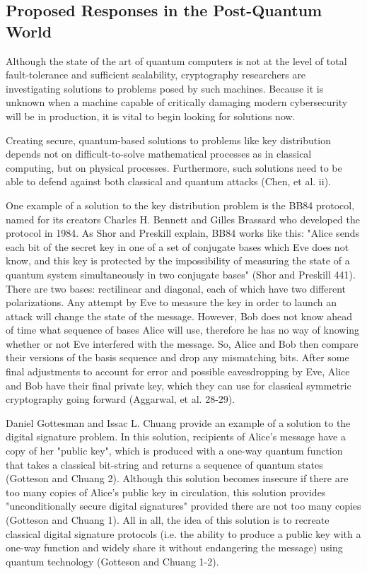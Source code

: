 \documentclass[11pt]{article}
\begin{document}
    

   \subsection{Proposed Responses in the Post-Quantum World}

Although the state of the art of quantum computers is not at the level of total fault-tolerance and sufficient scalability, cryptography researchers are investigating solutions to problems posed by such machines.
Because it is unknown when a machine capable of critically damaging modern cybersecurity will be in production, it is vital to begin looking for solutions now. 

Creating secure, quantum-based solutions to problems like key distribution depends not on difficult-to-solve mathematical processes as in classical computing, but on physical processes. Furthermore, such solutions need to be able to defend against both classical and quantum attacks (Chen, et al. ii). 

One example of a solution to the key distribution problem is the BB84 protocol, named for its creators Charles H. Bennett and Gilles Brassard who developed the protocol in 1984. As Shor and Preskill explain, BB84 works like this: "Alice sends each bit of the secret key in one of a set of conjugate bases which Eve does not know, and this key is protected by the impossibility of measuring the state of a quantum system simultaneously in two conjugate bases" (Shor and Preskill 441). There are two bases: rectilinear and diagonal, each of which have two different polarizations. Any attempt by Eve to measure the key in order to launch an attack will change the state of the message. However, Bob does not know ahead of time what sequence of bases Alice will use, therefore he has no way of knowing whether or not Eve interfered with the message. So, Alice and Bob then compare their versions of the basis sequence and drop any mismatching bits. After some final adjustments to account for error and possible eavesdropping by Eve, Alice and Bob have their final private key, which they can use for classical symmetric cryptography going forward (Aggarwal, et al. 28-29). 

Daniel Gottesman and Issac L. Chuang provide an example of a solution to the digital signature problem. In this solution, recipients of Alice's message have a copy of her "public key", which is produced with a one-way quantum function that takes a classical bit-string and returns a sequence of quantum states (Gotteson and Chuang 2). Although this solution becomes insecure if there are too many copies of Alice's public key in circulation, this solution provides "unconditionally secure digital signatures" provided there are not too many copies (Gotteson and Chuang 1). All in all, the idea of this solution is to recreate classical digital signature protocols (i.e. the ability to produce a public key with a one-way function and widely share it without endangering the message) using quantum technology (Gotteson and Chuang 1-2).
\end{document}
